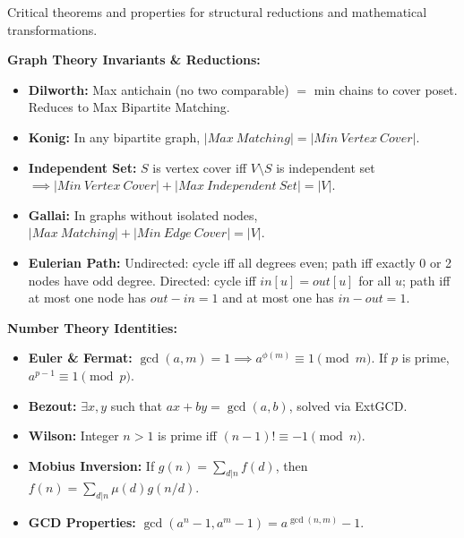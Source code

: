
Critical theorems and properties for structural reductions and mathematical transformations.

\textbf{Graph Theory Invariants \& Reductions:}
\begin{itemize}
    \item \textbf{Dilworth:} Max antichain (no two comparable) $=$ min chains to cover poset. Reduces to Max Bipartite Matching.
    \item \textbf{Konig:} In any bipartite graph, $|Max\ Matching| = |Min\ Vertex\ Cover|$.
    \item \textbf{Independent Set:} $S$ is vertex cover iff $V \setminus S$ is independent set $\implies |Min\ Vertex\ Cover| + |Max\ Independent\ Set| = |V|$.
    \item \textbf{Gallai:} In graphs without isolated nodes, $|Max\ Matching| + |Min\ Edge\ Cover| = |V|$.
    \item \textbf{Eulerian Path:} Undirected: cycle iff all degrees even; path iff exactly 0 or 2 nodes have odd degree. Directed: cycle iff $in[u]=out[u]$ for all $u$; path iff at most one node has $out-in=1$ and at most one has $in-out=1$.
\end{itemize}

\textbf{Number Theory Identities:}
\begin{itemize}
    \item \textbf{Euler \& Fermat:} $\gcd(a, m) = 1 \implies a^{\phi(m)} \equiv 1 \pmod m$. If $p$ is prime, $a^{p-1} \equiv 1 \pmod p$.
    \item \textbf{Bezout:} $\exists x, y$ such that $ax + by = \gcd(a, b)$, solved via ExtGCD.
    \item \textbf{Wilson:} Integer $n > 1$ is prime iff $(n-1)! \equiv -1 \pmod n$.
    \item \textbf{Mobius Inversion:} If $g(n) = \sum_{d|n} f(d)$, then $f(n) = \sum_{d|n} \mu(d)g(n/d)$.
    \item \textbf{GCD Properties:} $\gcd(a^n - 1, a^m - 1) = a^{\gcd(n, m)} - 1$.
\end{itemize}
